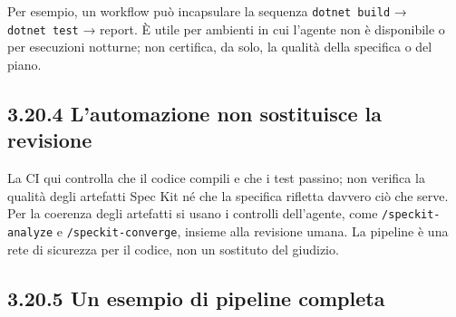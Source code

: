 \documentclass[
  italian,
  10pt,
]{book}
\begin{document}
Per esempio, un workflow può incapsulare la sequenza
\texttt{dotnet\ build} → \texttt{dotnet\ test} → report. È utile per
ambienti in cui l'agente non è disponibile o per esecuzioni notturne;
non certifica, da solo, la qualità della specifica o del piano.

\subsection{3.20.4 L'automazione non sostituisce la
revisione}\label{lautomazione-non-sostituisce-la-revisione}

La CI qui controlla che il codice compili e che i test passino; non
verifica la qualità degli artefatti Spec Kit né che la specifica
rifletta davvero ciò che serve. Per la coerenza degli artefatti si usano
i controlli dell'agente, come \texttt{/speckit-analyze} e
\texttt{/speckit-converge}, insieme alla revisione umana. La pipeline è
una rete di sicurezza per il codice, non un sostituto del giudizio.

\subsection{3.20.5 Un esempio di pipeline
completa}\label{un-esempio-di-pipeline-completa}
\end{document}
